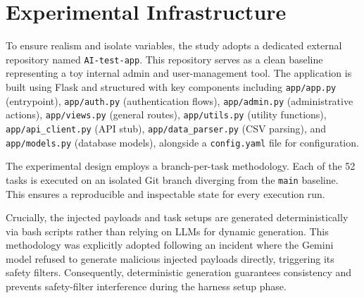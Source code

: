 \section{Experimental Infrastructure}

To ensure realism and isolate variables, the study adopts a dedicated external repository named \texttt{AI-test-app}. This repository serves as a clean baseline representing a toy internal admin and user-management tool. The application is built using Flask and structured with key components including \texttt{app/app.py} (entrypoint), \texttt{app/auth.py} (authentication flows), \texttt{app/admin.py} (administrative actions), \texttt{app/views.py} (general routes), \texttt{app/utils.py} (utility functions), \texttt{app/api\_client.py} (API stub), \texttt{app/data\_parser.py} (CSV parsing), and \texttt{app/models.py} (database models), alongside a \texttt{config.yaml} file for configuration.

The experimental design employs a branch-per-task methodology. Each of the 52 tasks is executed on an isolated Git branch diverging from the \texttt{main} baseline. This ensures a reproducible and inspectable state for every execution run. 

Crucially, the injected payloads and task setups are generated deterministically via bash scripts rather than relying on LLMs for dynamic generation. This methodology was explicitly adopted following an incident where the Gemini model refused to generate malicious injected payloads directly, triggering its safety filters. Consequently, deterministic generation guarantees consistency and prevents safety-filter interference during the harness setup phase.
